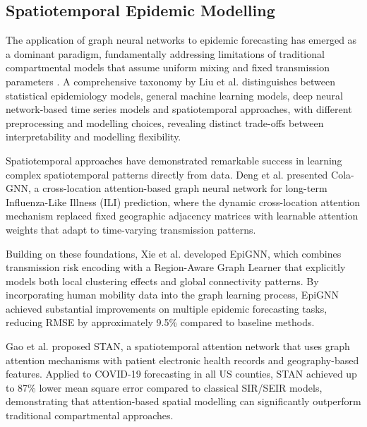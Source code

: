 \documentclass[a4paper,fleqn]{cas-dc}
\begin{document}

\subsection{Spatiotemporal Epidemic Modelling}
The application of graph neural networks to epidemic forecasting has emerged as a dominant paradigm, fundamentally addressing limitations of traditional compartmental models that assume uniform mixing and fixed transmission parameters \cite{lijingwangCausalGNNCausalBasedGraph2022}. A comprehensive taxonomy by Liu et al. \cite{liuReviewGraphNeural2024a, wang_deepest_2024} distinguishes between statistical epidemiology models, general machine learning models, deep neural network-based time series models and spatiotemporal approaches, with different preprocessing and modelling choices, revealing distinct trade-offs between interpretability and modelling flexibility.

Spatiotemporal approaches have demonstrated remarkable success in learning complex spatiotemporal patterns directly from data. Deng et al. \cite{dengColaGNNCrosslocationAttention2020a} presented Cola-GNN, a cross-location attention-based graph neural network for long-term Influenza-Like Illness (ILI) prediction, where the dynamic cross-location attention mechanism replaced fixed geographic adjacency matrices with learnable attention weights that adapt to time-varying transmission patterns.

Building on these foundations, Xie et al. \cite{xie2022epignn} developed EpiGNN, which combines transmission risk encoding with a Region-Aware Graph Learner that explicitly models both local clustering effects and global connectivity patterns. By incorporating human mobility data into the graph learning process, EpiGNN achieved substantial improvements on multiple epidemic forecasting tasks, reducing RMSE by approximately 9.5\% compared to baseline methods.

Gao et al. \cite{gao2021stan} proposed STAN, a spatiotemporal attention network that uses graph attention mechanisms with patient electronic health records and geography-based features. Applied to COVID-19 forecasting in all US counties, STAN achieved up to 87\% lower mean square error compared to classical SIR/SEIR models, demonstrating that attention-based spatial modelling can significantly outperform traditional compartmental approaches.
\end{document}
